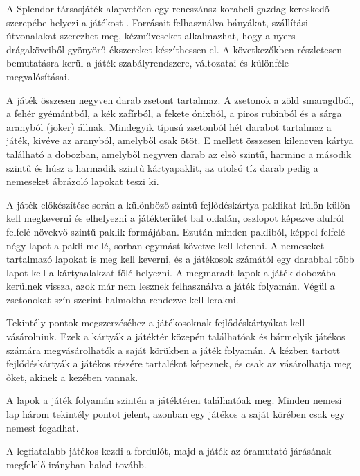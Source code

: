
A Splendor társasjáték alapvetően egy reneszánsz korabeli gazdag kereskedő szerepébe helyezi a játékost \cite{rulebook}.
Forrásait felhasználva bányákat, szállítási útvonalakat szerezhet meg, kézműveseket
alkalmazhat, hogy a nyers drágaköveiből gyönyörű ékszereket készíthessen el.
A következőkben részletesen bemutatásra kerül a játék szabályrendszere, változatai és különféle megvalósításai.


A játék összesen negyven darab zsetont tartalmaz. A zsetonok a zöld smaragdból, a fehér gyémántból, a kék zafírból, a fekete ónixból, a piros rubinból és a sárga aranyból (joker) állnak. Mindegyik típusú zsetonból hét darabot tartalmaz a játék, kivéve az aranyból, amelyből csak ötöt. E mellett összesen kilencven kártya található a dobozban, amelyből negyven darab az első szintű, harminc a második szintű és húsz a harmadik szintű kártyapaklit, az utolsó tíz darab pedig a nemeseket ábrázoló lapokat teszi ki.

A játék előkészítése során a különböző szintű fejlődéskártya paklikat külön-külön kell megkeverni és elhelyezni a játékterület bal oldalán, oszlopot képezve alulról felfelé növekvő szintű paklik formájában.
Ezután minden pakliból, képpel felfelé négy lapot a pakli mellé, sorban
egymást követve kell letenni.
A nemeseket tartalmazó lapokat is meg kell keverni, és a játékosok számától egy darabbal több lapot kell a kártyaalakzat fölé helyezni. A megmaradt lapok a játék dobozába kerülnek vissza, azok már nem lesznek
felhasználva a játék folyamán. Végül a zsetonokat szín szerint halmokba rendezve kell lerakni.


Tekintély pontok megszerzéséhez a játékosoknak fejlődéskártyákat kell vásárolniuk. Ezek a kártyák a játéktér közepén találhatóak és bármelyik játékos számára megvásárolhatók a saját körükben a játék folyamán. A kézben tartott fejlődéskártyák a játékos részére tartalékot képeznek, és csak az vásárolhatja meg őket, akinek a kezében vannak.


A lapok a játék folyamán szintén a játéktéren találhatóak meg. Minden nemesi lap három tekintély pontot jelent, azonban egy játékos a saját körében csak egy nemest fogadhat.


A legfiatalabb játékos kezdi a fordulót, majd a játék az óramutató járásának megfelelő irányban halad tovább.

